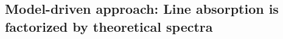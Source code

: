 \documentclass[modern]{aastex631}
\newcommand{\vectheta}{\boldsymbol{\theta}}
\newcommand{\vecpsi}{\boldsymbol{\psi}}
\newcommand{\vecH}{\mathbf{H}}
\begin{document}




\subsection{Model-driven approach: Line absorption is factorized by theoretical spectra}
\label{sec:model-method}
\end{document}
